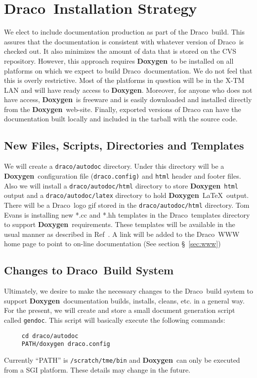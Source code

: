 \documentclass[11pt]{nmemo}
\newcommand{\draco}{{\normalfont\sffamily Draco}}
\newcommand{\doxy}{{\normalfont\bfseries Doxygen}}
\begin{document}

\section{\draco\ Installation Strategy}
\label{sec:draco}

We elect to include documentation
production as part of the \draco\ build. This assures that the
documentation is consistent with whatever version of \draco\ is
checked out. It also minimizes the amount of data that is stored on
the CVS repository. However, this approach requires
\doxy\ to be installed on all platforms on which we expect to build
\draco\ documentation.  We do not feel that this is overly restrictive.
Most of the platforms in question will be in the X-TM LAN and will have ready 
access to \doxy. Moreover, for anyone who does not
have access, \doxy\ is freeware and is easily downloaded and
installed directly from the \doxy\ web-site.
Finally, exported versions of Draco can have the documentation
built locally and included in the tarball with the source code. 

\subsection{New Files, Scripts, Directories and Templates}
We will create a \texttt{draco/autodoc} directory. Under this directory
will be a \doxy\ configuration file (\texttt{draco.config)} and
 \texttt{html} header and footer files. Also we will install 
a \texttt{draco/autodoc/html} directory to store \doxy\ \texttt{html}
output and a \texttt{draco/autodoc/latex}
directory to hold \doxy\ \LaTeX\ output. There will be a \draco\ logo gif
stored in the \texttt{draco/autodoc/html} directory. 
Tom Evans is installing new *.cc and *.hh templates in the \draco\ 
templates directory to support \doxy\ requirements. These templates
will be available in the usual manner as described in Ref~\cite{xtm:9909}.
A link will be added to the \draco\ WWW home page to point to on-line
documentation (See section \S~\ref{sec:www})

\subsection{Changes to \draco\ Build System}

Ultimately, we desire to make the necessary changes to the \draco\
build system to support \doxy\ documentation builds, installs, cleans,
etc. in a general way. For the present, 
we will create and store a small document generation 
script called \texttt{gendoc}. This 
script will basically execute the following commands:
\begin{verbatim} 
     cd draco/autodoc
     PATH/doxygen draco.config
\end{verbatim}
Currently ``PATH'' is \texttt{/scratch/tme/bin} and \doxy\
can only be executed from a SGI platform. These details may
change in the future. 
\end{document}
